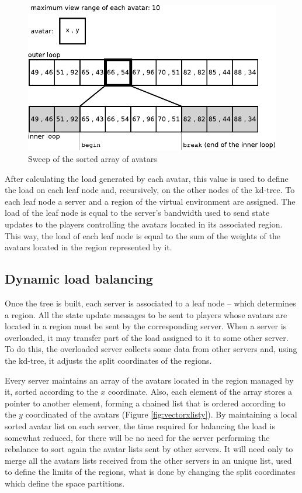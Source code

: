 \begin{figure}
  \centering
  \includegraphics[width=0.8\linewidth]{images/sweep}
  \caption{Sweep of the sorted array of avatars}
   \label{fig:sweep}
\end{figure}

After calculating the load generated by each avatar, this value is used to define the load on each leaf node and, recursively, on the other nodes of the kd-tree. To each leaf node a server and a region of the virtual environment are assigned. The load of the leaf node is equal to the server's bandwidth used to send state updates to the players controlling the avatars located in its associated region. This way, the load of each leaf node is equal to the sum of the weights of the avatars located in the region represented by it.

\subsection{Dynamic load balancing}

Once the tree is built, each server is associated to a leaf node -- which determines a region. All the state update messages to be sent to players whose avatars are located in a region must be sent by the corresponding server. When a server is overloaded, it may transfer part of the load assigned to it to some other server. To do this, the overloaded server collects some data from other servers and, using the kd-tree, it adjusts the split coordinates of the regions.

Every server maintains an array of the avatars located in the region managed by it, sorted according to the $x$ coordinate. Also, each element of the array stores a pointer to another element, forming a chained list that is ordered according to the $y$ coordinated of the avatars (Figure \ref{fig:vectorxlisty}). By maintaining a local sorted avatar list on each server, the time required for balancing the load is somewhat reduced, for there will be no need for the server performing the rebalance to sort again the avatar lists sent by other servers. It will need only to merge all the avatars lists received from the other servers in an unique list, used to define the limits of the regions, what is done by changing the split coordinates which define the space partitions.

